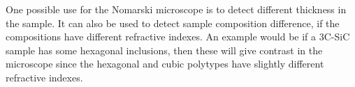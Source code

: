 One possible use for the Nomarski microscope is to detect different thickness in the sample. It can also be used to detect  sample composition difference, if the compositions have different refractive indexes. An example would be if a 3C-SiC sample has some hexagonal inclusions, then these will give contrast in the microscope since the hexagonal and cubic polytypes have slightly different refractive indexes. 






































